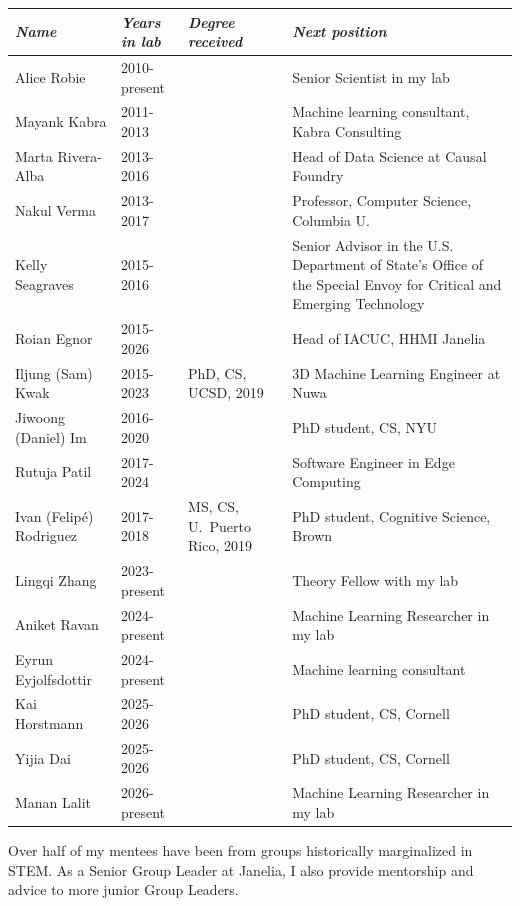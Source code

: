\documentclass[11pt, letterpaper]{awesome-cv}
\begin{document}
\vspace{\acvSectionContentTopSkip}
\vspace{\acvSectionContentTopSkip}
\begingroup
\begin{center}
\fontsize{10pt}{1em}\bodyfont\upshape\selectfont
\setlength{\tabcolsep}{6pt}
\begin{tabular}{ll>{\raggedright\arraybackslash}p{1.5in}>{\raggedright\arraybackslash}p{2.5in}}
\hline
  {\em Name} & {\em Years in lab} & {\em Degree received} & {\em Next position} \\\hline\hline
  Alice Robie & 2010-present & & Senior Scientist in my lab \\
  Mayank Kabra & 2011-2013 & & Machine learning consultant, Kabra Consulting \\
  Marta Rivera-Alba & 2013-2016& & Head of Data Science at Causal Foundry\\
  Nakul Verma & 2013-2017 & & Professor, Computer Science, Columbia U.\\
  Kelly Seagraves & 2015-2016 & & Senior Advisor in the U.S. Department of State’s Office of the Special Envoy for Critical and Emerging Technology \\
  Roian Egnor & 2015-2026 & & Head of IACUC, HHMI Janelia\\
  Iljung (Sam) Kwak & 2015-2023 & PhD, CS, UCSD, 2019 & 3D Machine Learning Engineer at Nuwa\\
  Jiwoong (Daniel) Im & 2016-2020 & & PhD student, CS, NYU\\
  Rutuja Patil & 2017-2024 & & Software Engineer in Edge Computing\\
  Ivan (Felip\'e) Rodriguez & 2017-2018 & MS, CS, U.~Puerto Rico, 2019 & PhD student, Cognitive Science, Brown \\
  Lingqi Zhang & 2023-present & & Theory Fellow with my lab \\
  Aniket Ravan & 2024-present & & Machine Learning Researcher in my lab \\
  Eyrun Eyjolfsdottir & 2024-present & & Machine learning consultant \\
  Kai Horstmann & 2025-2026 & & PhD student, CS, Cornell\\
  Yijia Dai & 2025-2026 & & PhD student, CS, Cornell\\
  Manan Lalit & 2026-present & & Machine Learning Researcher in my lab \\
  \hline
\end{tabular}
\end{center}
\endgroup
\vspace{.25cm}
Over half of my mentees have been from groups historically marginalized in STEM. As a Senior Group Leader at Janelia, I also provide mentorship and advice to more junior Group Leaders. 
\end{document}
